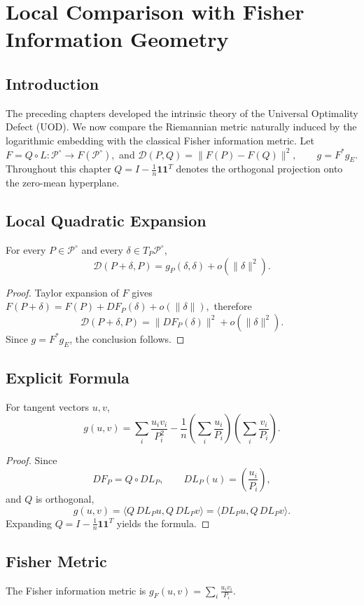 \chapter[Local Comparison with Fisher]{Local Comparison with Fisher Information Geometry}
\section{Introduction}
The preceding chapters developed the intrinsic theory of the Universal
Optimality Defect (UOD). We now compare the Riemannian metric naturally
induced by the logarithmic embedding with the classical Fisher
information metric.
Let
$F=Q\circ L:\mathcal P^\circ\rightarrow F(\mathcal P^\circ),$
and
$\mathcal D(P,Q)=\|F(P)-F(Q)\|^2, \qquad g=F^{*}g_E.$
Throughout this chapter \(Q=I-\frac1n\mathbf{11}^T\) denotes the
orthogonal projection onto the zero-mean hyperplane.
\section{Local Quadratic Expansion}
\begin{theorem}
\label{ch:thm:25-1}
For every \(P\in\mathcal P^\circ\) and every
\(\delta\in T_P\mathcal P^\circ\),
\[ \mathcal D(P+\delta,P) =
g_P(\delta,\delta) + o(\|\delta\|^2). \]
\end{theorem}
\begin{proof}
Taylor expansion of \(F\) gives
$F(P+\delta)=F(P)+DF_P(\delta)+o(\|\delta\|),$
therefore
\[ \mathcal D(P+\delta,P) =
\|DF_P(\delta)\|^2 + o(\|\delta\|^2). \]
Since \(g=F^{*}g_E\), the conclusion follows. 
\end{proof}
\section{Explicit Formula}
\begin{proposition}
\label{ch:prop:25-2}
For tangent vectors \(u,v\),
\[ g(u,v) = \sum_i\frac{u_iv_i}{P_i^2} -
\frac1n
\left(\sum_i\frac{u_i}{P_i}\right)
\left(\sum_i\frac{v_i}{P_i}\right). \]
\end{proposition}
\begin{proof}
Since
\[ DF_P=Q\circ DL_P, \qquad
DL_P(u)=\left(\frac{u_i}{P_i}\right), \]
and \(Q\) is orthogonal,
\[ g(u,v) = \langle Q\,DL_P u,Q\,DL_P v\rangle =
\langle DL_P u,Q\,DL_P v\rangle. \]
Expanding \(Q=I-\frac1n\mathbf{11}^T\) yields the formula. 
\end{proof}
\section{Fisher Metric}
The Fisher information metric is
$g_F(u,v) = \sum_i\frac{u_iv_i}{P_i}.$
